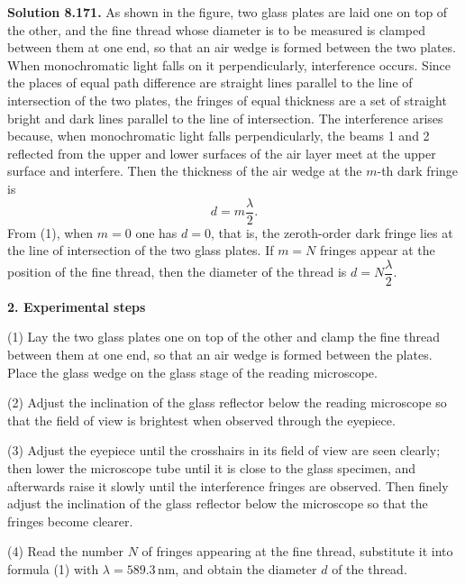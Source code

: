 \textbf{Solution 8.17}\quad \textbf{1.} As shown in the figure, two glass plates are laid one on top of the other, and the fine thread whose diameter is to be measured is clamped between them at one end, so that an air wedge is formed between the two plates. When monochromatic light falls on it perpendicularly, interference occurs. Since the places of equal path difference are straight lines parallel to the line of intersection of the two plates, the fringes of equal thickness are a set of straight bright and dark lines parallel to the line of intersection. The interference arises because, when monochromatic light falls perpendicularly, the beams 1 and 2 reflected from the upper and lower surfaces of the air layer meet at the upper surface and interfere. Then the thickness of the air wedge at the $m$-th dark fringe is
\begin{equation}
d=m\frac{\lambda}{2}. \tag{1}
\end{equation}
From (1), when $m=0$ one has $d=0$, that is, the zeroth-order dark fringe lies at the line of intersection of the two glass plates. If $m=N$ fringes appear at the position of the fine thread, then the diameter of the thread is $d=N\dfrac{\lambda}{2}$.

\textbf{2. Experimental steps}

(1) Lay the two glass plates one on top of the other and clamp the fine thread between them at one end, so that an air wedge is formed between the plates. Place the glass wedge on the glass stage of the reading microscope.

(2) Adjust the inclination of the glass reflector below the reading microscope so that the field of view is brightest when observed through the eyepiece.

(3) Adjust the eyepiece until the crosshairs in its field of view are seen clearly; then lower the microscope tube until it is close to the glass specimen, and afterwards raise it slowly until the interference fringes are observed. Then finely adjust the inclination of the glass reflector below the microscope so that the fringes become clearer.

(4) Read the number $N$ of fringes appearing at the fine thread, substitute it into formula (1) with $\lambda=589.3\,\mathrm{nm}$, and obtain the diameter $d$ of the thread.

